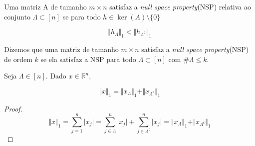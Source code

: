 \begin{definicao} Uma matriz A de tamanho $m \times n$ satisfaz a \textit{null space property}(NSP) relativa ao conjunto $\Lambda \subset [n]$ se para todo $h \in \ker(A) \setminus \lbrace 0 \rbrace$


$$ \Vert h_{\Lambda} \Vert_1 <  \Vert h_{\Lambda^{\mathsf{c}}} \Vert_1$$
\end{definicao}

\begin{definicao}
Dizemos que uma matriz de tamanho $m \times n$ satisfaz a \textit{null space property}(NSP) de ordem $k$ se ela satisfaz a NSP para todo $\Lambda \subset [n]$ com $\# \Lambda \leq k$.
\end{definicao}

\begin{lema}
Seja $\Lambda \in [n]$. Dado $x \in \mathbb{R}^n,$

$$ \Vert x \Vert_1 = \Vert x_{\Lambda} \Vert_1 + \Vert x_{\Lambda^{\mathsf{c}}} \Vert_1 $$
\end{lema}
\begin{proof} %
$$
\Vert x \Vert_1 = \sum_{j = 1}^n \vert x_j \vert
= \sum_{j \in \Lambda}^n \vert x_j \vert + \sum_{j \in \Lambda^{\mathsf{c}}}^n \vert x_j \vert
= \Vert x_{\Lambda} \Vert_1 + \Vert x_{\Lambda^{\mathsf{c}}} \Vert_1
$$
\end{proof}

